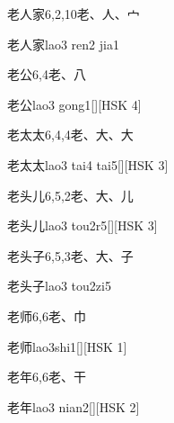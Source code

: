 \begin{entry}{老人家}{6,2,10}{⽼、⼈、⼧}
  \begin{phonetics}{老人家}{lao3 ren2 jia1}
  \end{phonetics}
\end{entry}

\begin{entry}{老公}{6,4}{⽼、⼋}
  \begin{phonetics}{老公}{lao3 gong1}[][HSK 4]
  \end{phonetics}
\end{entry}

\begin{entry}{老太太}{6,4,4}{⽼、⼤、⼤}
  \begin{phonetics}{老太太}{lao3 tai4 tai5}[][HSK 3]
  \end{phonetics}
\end{entry}

\begin{entry}{老头儿}{6,5,2}{⽼、⼤、⼉}
  \begin{phonetics}{老头儿}{lao3 tou2r5}[][HSK 3]
  \end{phonetics}
\end{entry}

\begin{entry}{老头子}{6,5,3}{⽼、⼤、⼦}
  \begin{phonetics}{老头子}{lao3 tou2zi5}
  \end{phonetics}
\end{entry}

\begin{entry}{老师}{6,6}{⽼、⼱}
  \begin{phonetics}{老师}{lao3shi1}[][HSK 1]
  \end{phonetics}
\end{entry}

\begin{entry}{老年}{6,6}{⽼、⼲}
  \begin{phonetics}{老年}{lao3 nian2}[][HSK 2]
  \end{phonetics}
\end{entry}

